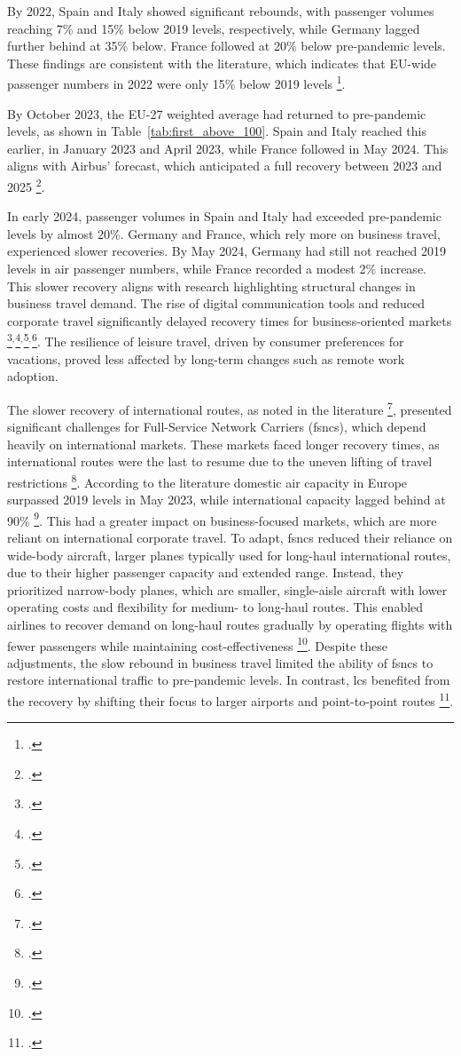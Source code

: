 \documentclass[12pt,onehalfspacing,headsepline,oneside,openright,a4paper, fleqn]{report}
\begin{document}
By 2022, Spain and Italy showed significant rebounds, with passenger volumes reaching 7\% and 15\% below 2019 levels, respectively, while Germany lagged further behind at 35\% below. France followed at 20\% below pre-pandemic levels. These findings are consistent with the literature, which indicates that EU-wide passenger numbers in 2022 were only 15\% below 2019 levels \footcite[137]{sun2023}. 

By October 2023, the EU-27 weighted average had returned to pre-pandemic levels, as shown in Table~\ref{tab:first_above_100}. Spain and Italy reached this earlier, in January 2023 and April 2023, while France followed in May 2024. This aligns with Airbus’ forecast, which anticipated a full recovery between 2023 and 2025 \footcite[18]{airbus2023}.

In early 2024, passenger volumes in Spain and Italy had exceeded pre-pandemic levels by almost 20\%. Germany and France, which rely more on business travel, experienced slower recoveries. By May 2024, Germany had still not reached 2019 levels in air passenger numbers, while France recorded a modest 2\% increase. This slower recovery aligns with research highlighting structural changes in business travel demand. The rise of digital communication tools and reduced corporate travel significantly delayed recovery times for business-oriented markets \footcite[9]{dube2021b}$^,$\footcite[4]{suau2020}$^,$\footcite{schwarzmuller2018}$^,$\footcite{denstadli2013}. The resilience of leisure travel, driven by consumer preferences for vacations, proved less affected by long-term changes such as remote work adoption.

The slower recovery of international routes, as noted in the literature \footcite[144-147]{sun2023}, presented significant challenges for Full-Service Network Carriers (\gls{fsncs}), which depend heavily on international markets. These markets faced longer recovery times, as international routes were the last to resume due to the uneven lifting of travel restrictions \footcite[5]{suau2020}. According to the literature domestic air capacity in Europe surpassed 2019 levels in May 2023, while international capacity lagged behind at 90\% \footcite[18]{airbus2023}. This had a greater impact on business-focused markets, which are more reliant on international corporate travel. To adapt, \gls{fsncs} reduced their reliance on wide-body aircraft, larger planes typically used for long-haul international routes, due to their higher passenger capacity and extended range. Instead, they prioritized narrow-body planes, which are smaller, single-aisle aircraft with lower operating costs and flexibility for medium- to long-haul routes. This enabled airlines to recover demand on long-haul routes gradually by operating flights with fewer passengers while maintaining cost-effectiveness  \footcite[3-5]{suau2020}. Despite these adjustments, the slow rebound in business travel limited the ability of \gls{fsncs} to restore international traffic to pre-pandemic levels. In contrast, \gls{lcs} benefited from the recovery by shifting their focus to larger airports and point-to-point routes \footcite[144-147]{sun2023}. 
\\
\end{document}
